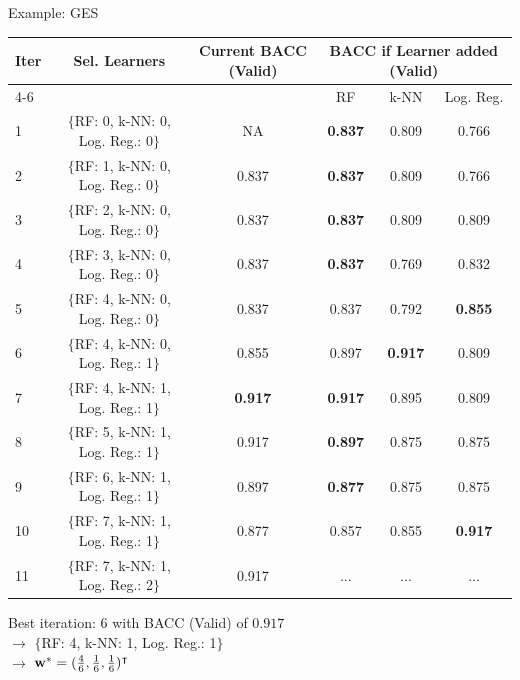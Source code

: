 \documentclass[11pt,compress,t,notes=noshow, aspectratio=169, xcolor=table]{beamer}
\begin{document}

\begin{vbframe}{Example: GES}
\begin{table}[h]
\footnotesize
\centering
\begin{tabular}{lccccc}
\hline
\textbf{Iter} & \textbf{Sel. Learners} & \textbf{Current BACC} (Valid) & \multicolumn{3}{c}{\textbf{BACC if Learner added} (Valid)}\\ \cline{4-6}
& & & RF & k-NN & Log. Reg.\\ \hline
1  & $\{$RF: 0, k-NN: 0, Log. Reg.: 0$\}$ & NA    & \textbf{0.837} & 0.809 & 0.766\\
2  & $\{$RF: 1, k-NN: 0, Log. Reg.: 0$\}$ & 0.837 & \textbf{0.837} & 0.809 & 0.766\\
3  & $\{$RF: 2, k-NN: 0, Log. Reg.: 0$\}$ & 0.837 & \textbf{0.837} & 0.809 & 0.809\\
4  & $\{$RF: 3, k-NN: 0, Log. Reg.: 0$\}$ & 0.837 & \textbf{0.837} & 0.769 & 0.832\\
5  & $\{$RF: 4, k-NN: 0, Log. Reg.: 0$\}$ & 0.837 & 0.837 & 0.792 & \textbf{0.855}\\
6  & $\{$RF: 4, k-NN: 0, Log. Reg.: 1$\}$ & 0.855 & 0.897 & \textbf{0.917} & 0.809\\
7  & $\{$RF: 4, k-NN: 1, Log. Reg.: 1$\}$ & \textbf{0.917} & \textbf{0.917} & 0.895 & 0.809\\
8  & $\{$RF: 5, k-NN: 1, Log. Reg.: 1$\}$ & 0.917 & \textbf{0.897} & 0.875 & 0.875\\
9  & $\{$RF: 6, k-NN: 1, Log. Reg.: 1$\}$ & 0.897 & \textbf{0.877} & 0.875 & 0.875\\
10 & $\{$RF: 7, k-NN: 1, Log. Reg.: 1$\}$ & 0.877 & 0.857 & 0.855 & \textbf{0.917}\\
11 & $\{$RF: 7, k-NN: 1, Log. Reg.: 2$\}$ & 0.917 & ... & ... & ...\\
\hline
\end{tabular}
\label{table:learners_valid_test}
\end{table}
Best iteration: 6 with BACC (Valid) of $0.917$\\
$\rightarrow$ $\{$RF: 4, k-NN: 1, Log. Reg.: 1$\}$\\
$\rightarrow$ $\mathbf{w}^{*} = (\frac{4}{6}, \frac{1}{6}, \frac{1}{6})^\intercal$
\end{vbframe}

\end{document}
